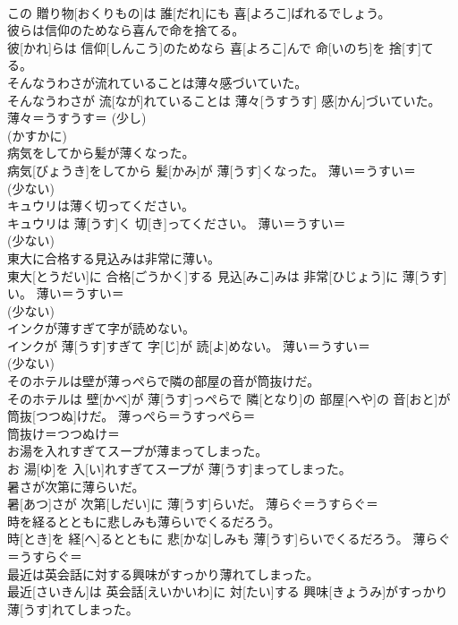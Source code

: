\documentclass[8pt]{extreport}
\begin{document}
\begin{CJK}{UTF8}{min}
{\\	この 贈り物[おくりもの]は 誰[だれ]にも 喜[よろこ]ばれるでしょう。	
\\	彼らは信仰のためなら喜んで命を捨てる。	
\\	彼[かれ]らは 信仰[しんこう]のためなら 喜[よろこ]んで 命[いのち]を 捨[す]てる。	
\\	そんなうわさが流れていることは薄々感づいていた。	
\\	そんなうわさが 流[なが]れていることは 薄々[うすうす] 感[かん]づいていた。	薄々＝うすうす＝ (少し) 
\\	(かすかに) 
\\	病気をしてから髪が薄くなった。	
\\	病気[びょうき]をしてから 髪[かみ]が 薄[うす]くなった。	薄い＝うすい＝ 
\\	(少ない) 
\\	キュウリは薄く切ってください。	
\\	キュウリは 薄[うす]く 切[き]ってください。	薄い＝うすい＝ 
\\	(少ない) 
\\	東大に合格する見込みは非常に薄い。	
\\	東大[とうだい]に 合格[ごうかく]する 見込[みこ]みは 非常[ひじょう]に 薄[うす]い。	薄い＝うすい＝ 
\\	(少ない) 
\\	インクが薄すぎて字が読めない。	
\\	インクが 薄[うす]すぎて 字[じ]が 読[よ]めない。	薄い＝うすい＝ 
\\	(少ない) 
\\	そのホテルは壁が薄っぺらで隣の部屋の音が筒抜けだ。	
\\	そのホテルは 壁[かべ]が 薄[うす]っぺらで 隣[となり]の 部屋[へや]の 音[おと]が 筒抜[つつぬ]けだ。	薄っぺら＝うすっぺら＝ 
\\	筒抜け＝つつぬけ＝ 
\\	お湯を入れすぎてスープが薄まってしまった。	
\\	お 湯[ゆ]を 入[い]れすぎてスープが 薄[うす]まってしまった。	
\\	暑さが次第に薄らいだ。	
\\	暑[あつ]さが 次第[しだい]に 薄[うす]らいだ。	薄らぐ＝うすらぐ＝ 
\\	時を経るとともに悲しみも薄らいでくるだろう。	
\\	時[とき]を 経[へ]るとともに 悲[かな]しみも 薄[うす]らいでくるだろう。	薄らぐ＝うすらぐ＝ 
\\	最近は英会話に対する興味がすっかり薄れてしまった。	
\\	最近[さいきん]は 英会話[えいかいわ]に 対[たい]する 興味[きょうみ]がすっかり 薄[うす]れてしまった。	
}
\end{CJK}
\end{document}
